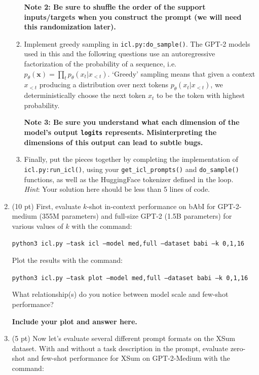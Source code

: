 \documentclass[12pt]{article}
\begin{document}
\begin{enumerate}
\begin{enumerate}
        \textbf{Note 2: Be sure to shuffle the order of the support inputs/targets when you construct the prompt (we will need this randomization later).}
        \item Implement greedy sampling in \texttt{icl.py:do\_sample()}. The GPT-2 models used in this and the following questions use an autoregressive factorization of the probability of a sequence, i.e. $p_\theta(\mathbf{x}) = \prod_t p_\theta(x_t|x_{<t})$. `Greedy' sampling means that given a context $x_{<t}$ producing a distribution over next tokens $p_\theta(x_t|x_{<t})$, we deterministically choose the next token $x_t$ to be the token with highest probability.
        
        \textbf{Note 3: Be sure you understand what each dimension of the model's output \texttt{logits} represents. Misinterpreting the dimensions of this output can lead to subtle bugs.}
        
        \item Finally, put the pieces together by completing the implementation of \texttt{icl.py:\allowbreak run\_icl()}, using your \texttt{get\_icl\_prompts()} and \texttt{do\_sample()} functions, as well as the HuggingFace tokenizer defined in the loop. \\ \emph{Hint}: Your solution here should be less than 5 lines of code.
    \end{enumerate}

    \item (10 pt) First, evaluate $k$-shot in-context performance on bAbI for GPT-2-medium (355M parameters) and full-size GPT-2 (1.5B parameters) for various values of $k$ with the command:
    
    \texttt{\small python3 icl.py --task icl --model med,full --dataset babi --k 0,1,16}
    
    Plot the results with the command:
    
    \texttt{\small python3 icl.py --task plot --model med,full --dataset babi --k 0,1,16}
    
    What relationship(s) do you notice between model scale and few-shot performance?
        
    \textbf{\color{red}Include your plot and answer here.}

    \item (5 pt) Now let's evaluate several different prompt formats on the XSum dataset. With and without a task description in the prompt, evaluate zero-shot and few-shot performance for XSum on GPT-2-Medium with the command:


\end{enumerate}
\end{document}
